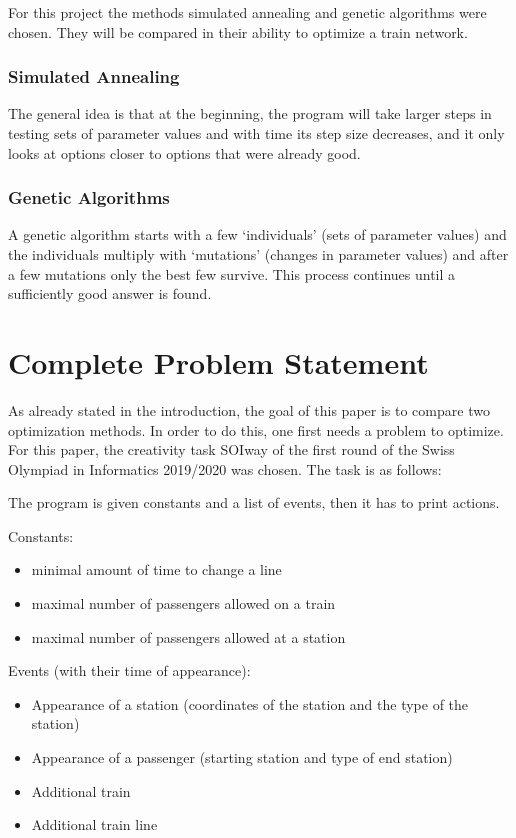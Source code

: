 \documentclass[10pt]{report}
\begin{document}
For this project the  methods simulated annealing and genetic algorithms were chosen. They will be compared in their ability to optimize a train network. 

\subsection{Simulated Annealing}
The general idea is that at the beginning, the program will take larger steps in testing sets of parameter values and with time its step size decreases, and it only looks at options closer to options that were already good. %

\subsection{Genetic Algorithms}
A genetic algorithm starts with a few ‘individuals’ (sets of parameter values) and the individuals multiply with ‘mutations’ (changes in parameter values) and after a few mutations only the best few survive. This process continues until a sufficiently good answer is found. %


\chapter{Complete Problem Statement}

As already stated in the introduction, the goal of this paper is to compare two optimization methods. In order to do this, one first needs a problem to optimize. For this paper, the creativity task SOIway of the first round of the Swiss Olympiad in Informatics 2019/2020 was chosen. The task is as follows:

The program is given constants and a list of events, then it has to print actions.

Constants:
\begin{itemize}
    \item minimal amount of time to change a line
    \item maximal number of passengers allowed on a train
    \item maximal number of passengers allowed at a station
\end{itemize}


Events (with their time of appearance):
\begin{itemize}
    \item Appearance of a station (coordinates of the station and the type of the station)
    \item Appearance of a passenger (starting station and type of end station)
    \item Additional train
    \item Additional train line
\end{itemize}
\end{document}
